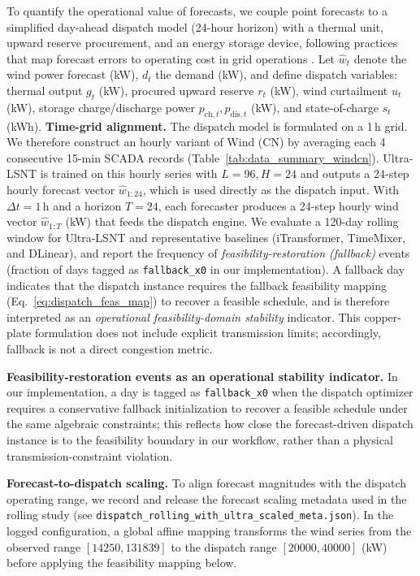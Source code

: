 \documentclass[review,3p,times]{elsarticle}
\begin{document}
To quantify the operational value of forecasts, we couple point forecasts to a simplified day-ahead dispatch model (24-hour horizon) with a thermal unit, upward reserve procurement, and an energy storage device, following practices that map forecast errors to operating cost in grid operations \cite{botterud2011operational,yan2025economicvalue}. Let $\hat{w}_t$ denote the wind power forecast (kW), $d_t$ the demand (kW), and define dispatch variables: thermal output $g_t$ (kW), procured upward reserve $r_t$ (kW), wind curtailment $u_t$ (kW), storage charge/discharge power $p_{\text{ch},t},p_{\text{dis},t}$ (kW), and state-of-charge $s_t$ (kWh). \textbf{Time-grid alignment.} The dispatch model is formulated on a 1\,h grid. We therefore construct an hourly variant of Wind (CN) by averaging each 4 consecutive 15-min SCADA records (Table~\ref{tab:data_summary_windcn}). Ultra-LSNT is trained on this hourly series with $L=96,H=24$ and outputs a 24-step hourly forecast vector $\hat{w}_{1:24}$, which is used directly as the dispatch input. With $\Delta t=1$\,h and a horizon $T=24$, each forecaster produces a 24-step hourly wind vector $\hat{w}_{1:T}$ (kW) that feeds the dispatch engine. We evaluate a 120-day rolling window for Ultra-LSNT and representative baselines (iTransformer, TimeMixer, and DLinear), and report the frequency of \emph{feasibility-restoration (fallback)} events (fraction of days tagged as \texttt{fallback\_x0} in our implementation). A fallback day indicates that the dispatch instance requires the fallback feasibility mapping (Eq.~\ref{eq:dispatch_feas_map}) to recover a feasible schedule, and is therefore interpreted as an \emph{operational feasibility-domain stability} indicator. This copper-plate formulation does not include explicit transmission limits; accordingly, fallback is not a direct congestion metric.

\noindent\textbf{Feasibility-restoration events as an operational stability indicator.}
In our implementation, a day is tagged as \texttt{fallback\_x0} when the dispatch optimizer requires a conservative fallback initialization to recover a feasible schedule under the same algebraic constraints; this reflects how close the forecast-driven dispatch instance is to the feasibility boundary in our workflow, rather than a physical transmission-constraint violation.

\noindent\textbf{Forecast-to-dispatch scaling.}
To align forecast magnitudes with the dispatch operating range, we record and release the forecast scaling metadata used in the rolling study (see \texttt{dispatch\_rolling\_with\_ultra\_scaled\_meta.json}). In the logged configuration, a global affine mapping transforms the wind series from the observed range $[14250,131839]$ to the dispatch range $[20000,40000]$ (kW) before applying the feasibility mapping below.
\end{document}
